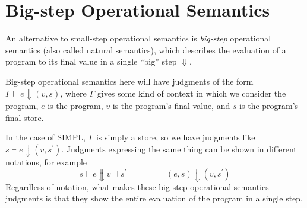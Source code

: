 \section{Big-step Operational Semantics}

An alternative to small-step operational semantics is \textit{big-step} operational semantics (also called natural semantics), which describes the evaluation of a program to its final value in a single ``big'' step \(\Downarrow\). 

Big-step operational semantics here will have judgments of the form \(\Gamma \vdash e \Downarrow (v, s)\), where \(\Gamma\) gives some kind of context in which we consider the program, \(e\) is the program, \(v\) is the program's final value, and \(s\) is the program's final store. 

In the case of SIMPL, \(\Gamma\) is simply a store, so we have judgments like \(s \vdash e \Downarrow (v, s^{\prime})\). Judgments expressing the same thing can be shown in different notations, for example
\[
  s \vdash e \Downarrow v \dashv s^{\prime} \hspace{2cm} (e, s) \Downarrow (v, s^{\prime})
\]
Regardless of notation, what makes these big-step operational semantics judgments is that they show the entire evaluation of the program in a single step. 

